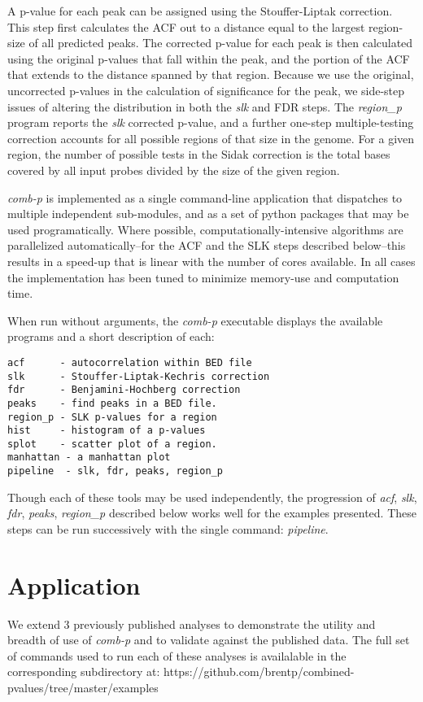 \documentclass{bioinfo}
\begin{document}
\begin{methods}
A p-value for each peak can be assigned using the Stouffer-Liptak
correction. This step first calculates the ACF out to a distance
equal to the largest region-size of all predicted peaks. The corrected
p-value for each peak is then calculated using the original p-values
that fall within the peak, and the portion of the ACF that extends to
the distance spanned by that region. Because we use the original,
uncorrected p-values in the calculation of significance for the peak,
we side-step issues of altering the distribution in both the
\textit{slk} and FDR steps. The \textit{region\_p} program reports the
\textit{slk} corrected p-value, and a further one-step \cite{Sidak}
multiple-testing correction accounts for all possible regions of that
size in the genome. For a given region, the number of possible tests
in the Sidak correction is the total bases covered by all input probes
divided by the size of the given region.

\textit{comb-p} is implemented as a single command-line application that
dispatches to multiple independent sub-modules, and as a set of python
packages that may be used programatically. Where possible,
computationally-intensive algorithms are parallelized
automatically--for the ACF and the SLK steps described below--this
results in a speed-up that is linear with the number of cores available.
In all cases the implementation has been tuned to minimize memory-use and
computation time.

When run without arguments, the \textit{comb-p} executable displays the
available programs and a short description of each:
\begin{verbatim}
acf      - autocorrelation within BED file
slk      - Stouffer-Liptak-Kechris correction
fdr      - Benjamini-Hochberg correction
peaks    - find peaks in a BED file.
region_p - SLK p-values for a region
hist     - histogram of a p-values
splot    - scatter plot of a region.
manhattan - a manhattan plot
pipeline  - slk, fdr, peaks, region_p
\end{verbatim}

Though each of these tools may be used independently, the progression of
\textit{acf}, \textit{slk}, \textit{fdr}, \textit{peaks}, \textit{region\_p}
described below works well for the examples presented. These steps can
be run successively with the single command: \textit{pipeline}.

\section{Application}
We extend 3 previously published analyses to demonstrate the utility and
breadth of use of \textit{comb-p} and to validate against the
published data. The full set of commands used to run each of these analyses
is availalable in the corresponding subdirectory at:
https://github.com/brentp/combined-pvalues/tree/master/examples


\end{methods}
\end{document}
